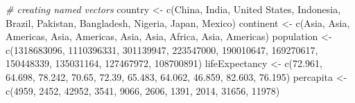 \documentclass[
]{book}
\newenvironment{Shaded}{\begin{snugshade}}{\end{snugshade}}
\newcommand{\CommentTok}[1]{\textcolor[rgb]{0.56,0.35,0.01}{\textit{#1}}}
\newcommand{\DecValTok}[1]{\textcolor[rgb]{0.00,0.00,0.81}{#1}}
\newcommand{\FloatTok}[1]{\textcolor[rgb]{0.00,0.00,0.81}{#1}}
\newcommand{\FunctionTok}[1]{\textcolor[rgb]{0.00,0.00,0.00}{#1}}
\newcommand{\NormalTok}[1]{#1}
\newcommand{\OtherTok}[1]{\textcolor[rgb]{0.56,0.35,0.01}{#1}}
\newcommand{\StringTok}[1]{\textcolor[rgb]{0.31,0.60,0.02}{#1}}
\begin{document}
\begin{Shaded}
\begin{Highlighting}[]
\CommentTok{\# creating named vectors}
\NormalTok{country }\OtherTok{\textless{}{-}} \FunctionTok{c}\NormalTok{(}\StringTok{\textquotesingle{}China\textquotesingle{}}\NormalTok{, }\StringTok{\textquotesingle{}India\textquotesingle{}}\NormalTok{, }\StringTok{\textquotesingle{}United States\textquotesingle{}}\NormalTok{, }\StringTok{\textquotesingle{}Indonesia\textquotesingle{}}\NormalTok{, }\StringTok{\textquotesingle{}Brazil\textquotesingle{}}\NormalTok{, }
             \StringTok{\textquotesingle{}Pakistan\textquotesingle{}}\NormalTok{, }\StringTok{\textquotesingle{}Bangladesh\textquotesingle{}}\NormalTok{, }\StringTok{\textquotesingle{}Nigeria\textquotesingle{}}\NormalTok{, }\StringTok{\textquotesingle{}Japan\textquotesingle{}}\NormalTok{, }\StringTok{\textquotesingle{}Mexico\textquotesingle{}}\NormalTok{)}
\NormalTok{continent }\OtherTok{\textless{}{-}} \FunctionTok{c}\NormalTok{(}\StringTok{\textquotesingle{}Asia\textquotesingle{}}\NormalTok{, }\StringTok{\textquotesingle{}Asia\textquotesingle{}}\NormalTok{, }\StringTok{\textquotesingle{}Americas\textquotesingle{}}\NormalTok{, }\StringTok{\textquotesingle{}Asia\textquotesingle{}}\NormalTok{, }\StringTok{\textquotesingle{}Americas\textquotesingle{}}\NormalTok{, }
               \StringTok{\textquotesingle{}Asia\textquotesingle{}}\NormalTok{, }\StringTok{\textquotesingle{}Asia\textquotesingle{}}\NormalTok{, }\StringTok{\textquotesingle{}Africa\textquotesingle{}}\NormalTok{, }\StringTok{\textquotesingle{}Asia\textquotesingle{}}\NormalTok{, }\StringTok{\textquotesingle{}Americas\textquotesingle{}}\NormalTok{)}
\NormalTok{population }\OtherTok{\textless{}{-}} \FunctionTok{c}\NormalTok{(}\DecValTok{1318683096}\NormalTok{, }\DecValTok{1110396331}\NormalTok{, }\DecValTok{301139947}\NormalTok{, }\DecValTok{223547000}\NormalTok{, }\DecValTok{190010647}\NormalTok{, }
                \DecValTok{169270617}\NormalTok{, }\DecValTok{150448339}\NormalTok{, }\DecValTok{135031164}\NormalTok{, }\DecValTok{127467972}\NormalTok{, }\DecValTok{108700891}\NormalTok{)}
\NormalTok{lifeExpectancy }\OtherTok{\textless{}{-}} \FunctionTok{c}\NormalTok{(}\FloatTok{72.961}\NormalTok{, }\FloatTok{64.698}\NormalTok{, }\FloatTok{78.242}\NormalTok{, }\FloatTok{70.65}\NormalTok{, }\FloatTok{72.39}\NormalTok{, }
                    \FloatTok{65.483}\NormalTok{, }\FloatTok{64.062}\NormalTok{, }\FloatTok{46.859}\NormalTok{, }\FloatTok{82.603}\NormalTok{, }\FloatTok{76.195}\NormalTok{)}
\NormalTok{percapita }\OtherTok{\textless{}{-}} \FunctionTok{c}\NormalTok{(}\DecValTok{4959}\NormalTok{, }\DecValTok{2452}\NormalTok{, }\DecValTok{42952}\NormalTok{, }\DecValTok{3541}\NormalTok{, }\DecValTok{9066}\NormalTok{, }\DecValTok{2606}\NormalTok{, }\DecValTok{1391}\NormalTok{, }\DecValTok{2014}\NormalTok{, }\DecValTok{31656}\NormalTok{, }\DecValTok{11978}\NormalTok{)}


\end{Highlighting}
\end{Shaded}
\end{document}
